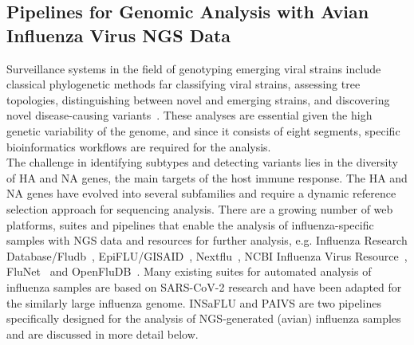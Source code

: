 \subsection{Pipelines for Genomic Analysis with Avian Influenza Virus NGS Data}
Surveillance systems in the field of genotyping emerging viral strains include classical phylogenetic methods far classifying viral strains, assessing tree topologies, distinguishing between novel and emerging strains, and discovering novel disease-causing variants~\cite{koboldt2013next}. These analyses are essential given the high genetic variability of the genome, and since it consists of eight segments, specific bioinformatics workflows are required for the analysis. \\
The challenge in identifying subtypes and detecting variants lies in the diversity of \ac{HA} and \ac{NA} genes, the main targets of the host immune response. The \ac{HA} and \ac{NA} genes have evolved into several subfamilies and require a dynamic reference selection approach for sequencing analysis. There are a growing number of web platforms, suites and pipelines that enable the analysis of influenza-specific samples with \ac{NGS} data and resources for further analysis, e.g. Influenza Research Database/Fludb~\cite{zhang2017influenza}, EpiFLU/GISAID~\cite{shu2017gisaid}, Nextflu~\cite{neher2015nextflu}, NCBI Influenza Virus Resource~\cite{bao2008influenza}, FluNet~\cite{flahault1998flunet} and OpenFluDB~\cite{liechti2010openfludb}. Many existing suites for automated analysis of influenza samples are based on \ac{SARS-CoV-2} research and have been adapted for the similarly large influenza genome. \ac{INSaFLU} and \ac{PAIVS} are two pipelines specifically designed for the analysis of \ac{NGS}-generated (avian) influenza samples and are discussed in more detail below.

